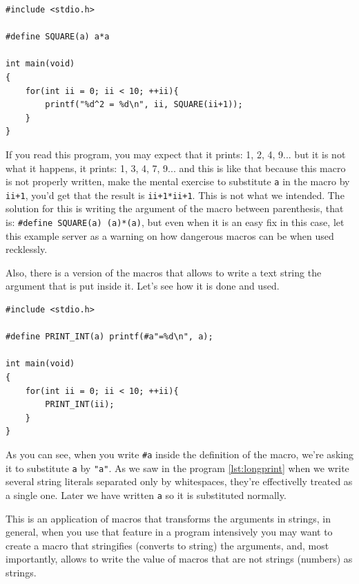 \documentclass[a4paper]{article}
\begin{document}
\noindent
\begin{minipage}[H]{\linewidth}
\mbox{}
\begin{lstlisting}[style=C,
caption={Example of error because of a macro},
label={lst:macroError}]
#include <stdio.h>

#define SQUARE(a) a*a

int main(void)
{
    for(int ii = 0; ii < 10; ++ii){
        printf("%d^2 = %d\n", ii, SQUARE(ii+1));
    }
}
\end{lstlisting}
\end{minipage}

If you read this program, you may expect that it prints: 1, 2, 4, 9... but
it is not what it happens, it prints: 1, 3, 4, 7, 9... and this is like that
because this macro is not properly written, make the mental exercise to
substitute \verb!a! in the macro by \verb!ii+1!, you'd get that the result is
\verb!ii+1*ii+1!. This is not what we intended. The solution for this is writing
the argument of the macro between parenthesis, that is:
\verb!#define SQUARE(a) (a)*(a)!, but even when it is an easy fix in this case,
let this example server as a warning on how dangerous macros can be when used
recklessly.

Also, there is a version of the macros that allows to write a text string the
argument that is put inside it. Let's see how it is done and used.

\noindent
\begin{minipage}[H]{\linewidth}
\mbox{}
\begin{lstlisting}[style=C,
caption={Use of macros with strings},
label={lst:macroText}]
#include <stdio.h>

#define PRINT_INT(a) printf(#a"=%d\n", a);

int main(void)
{
    for(int ii = 0; ii < 10; ++ii){
        PRINT_INT(ii);
    }
}
\end{lstlisting}
\end{minipage}

As you can see, when you write \verb!#a! inside the definition of the macro,
we're asking it to substitute \verb!a! by \verb!"a"!. As we saw in the program
\ref{lst:longprint} when we write several string literals separated only by
whitespaces, they're effectivelly treated as a single one. Later we have written
\verb!a! so it is substituted normally.

This is an application of macros that transforms the arguments in strings, in
general, when you use that feature in a program intensively you may want to
create a macro that stringifies (converts to string) the arguments, and, most
importantly, allows to write the value of macros that are not strings (numbers)
as strings.
\end{document}
